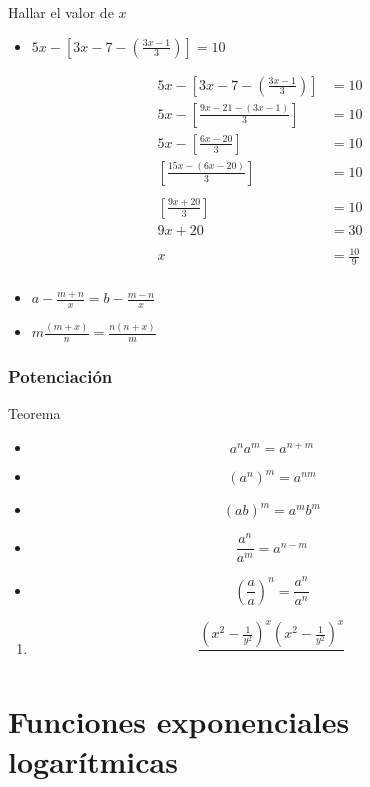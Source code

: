 \documentclass[
  16pt,
]{krantz}
\providecommand{\tightlist}{%
  \setlength{\itemsep}{0pt}\setlength{\parskip}{0pt}}
\theoremstyle{definition}
\theoremstyle{definition}
\theoremstyle{definition}
\theoremstyle{definition}
\theoremstyle{remark}
\begin{document}
Hallar el valor de \(x\)

\begin{itemize}
\tightlist
\item
  \(5x-[3x-7-(\frac{3x-1}{3})]=10\)
\end{itemize}

\[\begin{aligned}
5x-[3x-7-(\frac{3x-1}{3})]&=10\\
5x-[\frac{9x-21-(3x-1)}{3}]&=10\\5x-[\frac{6x-20}{3}]&=10\\
[\frac{15x-(6x-20)}{3}]&=10\\
\\
    [\frac{9x+20}{3}]&=10\\ {9x+20}&=30\\
    \\  x&=\frac{10}{9}\\
\end{aligned}
\]

\begin{itemize}
\tightlist
\item
  \(a-\frac{m+n}{x}=b-\frac{m-n}{x}\)
\item
  \(m\frac{(m+x)}{n}=\frac{n(n+x)}{m}\)
\end{itemize}

\hypertarget{potenciaciuxf3n}{%
\subsection{Potenciación}\label{potenciaciuxf3n}}

Teorema

\begin{itemize}
\tightlist
\item
  \[a^na^m=a^{n+m}\]
\item
  \[(a^n)^m=a^{nm}\]
\item
  \[(ab)^m=a^mb^m\]
\item
  \[\frac{a^n}{a^m}=a^{n-m}\]
\item
  \[(\frac{a}{a})^n=\frac{a^n}{a^n}\]
\end{itemize}

\begin{enumerate}
\def\labelenumi{\arabic{enumi}.}
\tightlist
\item
  \[\frac{(x^2-\frac{1}{y^2})^x(x^2-\frac{1}{y^2})^x}{}\]
\end{enumerate}

\hypertarget{funciones-exponenciales-logaruxedtmicas}{%
\chapter{Funciones exponenciales logarítmicas}\label{funciones-exponenciales-logaruxedtmicas}}
\end{document}
